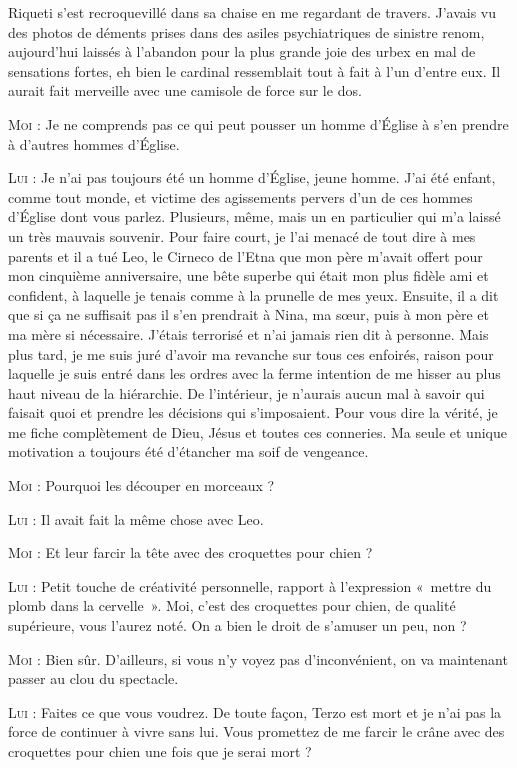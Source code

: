 Riqueti s’est recroquevillé dans sa chaise en me regardant de travers. J’avais vu des photos de déments prises dans des asiles psychiatriques de sinistre renom, aujourd’hui laissés à l’abandon pour la plus grande joie des urbex en mal de sensations fortes, eh bien le cardinal ressemblait tout à fait à l’un d’entre eux. Il aurait fait merveille avec une camisole de force sur le dos.

\textsc{Moi} : Je ne comprends pas ce qui peut pousser un homme d’Église à s’en prendre à d’autres hommes d’Église.

\textsc{Lui} : Je n’ai pas toujours été un homme d’Église, jeune homme. J’ai été enfant, comme tout monde, et victime des agissements pervers d’un de ces hommes d’Église dont vous parlez. Plusieurs, même, mais un en particulier qui m’a laissé un très mauvais souvenir. Pour faire court, je l’ai menacé de tout dire à mes parents et il a tué Leo, le Cirneco de l’Etna que mon père m’avait offert pour mon cinquième anniversaire, une bête superbe qui était mon plus fidèle ami et confident, à laquelle je tenais comme à la prunelle de mes yeux. Ensuite, il a dit que si ça ne suffisait pas il s’en prendrait à Nina, ma sœur, puis à mon père et ma mère si nécessaire. J’étais terrorisé et n’ai jamais rien dit à personne. Mais plus tard, je me suis juré d’avoir ma revanche sur tous ces enfoirés, raison pour laquelle je suis entré dans les ordres avec la ferme intention de me hisser au plus haut niveau de la hiérarchie. De l’intérieur, je n’aurais aucun mal à savoir qui faisait quoi et prendre les décisions qui s’imposaient. Pour vous dire la vérité, je me fiche complètement de Dieu, Jésus et toutes ces conneries. Ma seule et unique motivation a toujours été d’étancher ma soif de vengeance.

\textsc{Moi} : Pourquoi les découper en morceaux ?

\textsc{Lui} : Il avait fait la même chose avec Leo.

\textsc{Moi} : Et leur farcir la tête avec des croquettes pour chien ?

\textsc{Lui} : Petit touche de créativité personnelle, rapport à l’expression «~mettre du plomb dans la cervelle~». Moi, c’est des croquettes pour chien, de qualité supérieure, vous l’aurez noté. On a bien le droit de s’amuser un peu, non ?

\textsc{Moi} : Bien sûr. D’ailleurs, si vous n’y voyez pas d’inconvénient, on va maintenant passer au clou du spectacle.

\textsc{Lui} : Faites ce que vous voudrez. De toute façon, Terzo est mort et je n’ai pas la force de continuer à vivre sans lui. Vous promettez de me farcir le crâne avec des croquettes pour chien une fois que je serai mort ?

